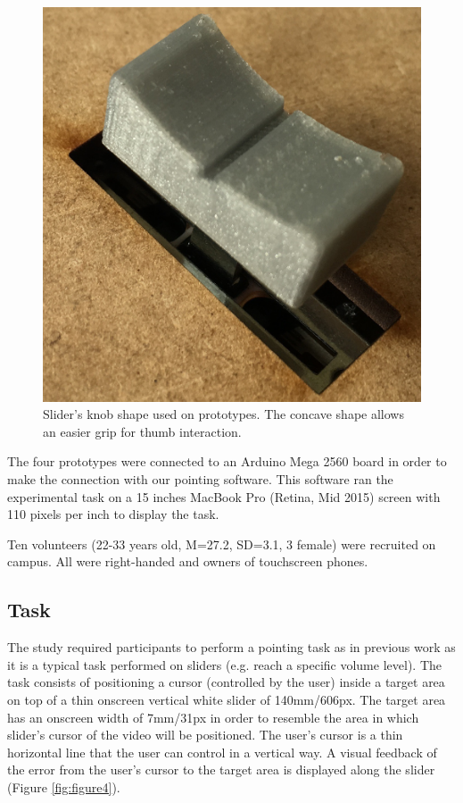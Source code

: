 \documentclass{sigchi}
\begin{document}
\begin{figure}[h]
\centering
  \includegraphics[width=0.4\columnwidth]{figures/knob}
  \caption{Slider's knob shape used on prototypes. The concave shape allows an easier grip for thumb interaction.}
  \label{fig:figure3}
\end{figure}

The four prototypes were connected to an Arduino Mega 2560 board in order to make the connection with our pointing software. This software ran the experimental task on a 15 inches MacBook Pro (Retina, Mid 2015) screen with 110 pixels per inch to display the task.

Ten volunteers (22-33 years old, M=27.2, SD=3.1, 3 female) were recruited on campus. All were right-handed and owners of touchscreen phones.

\subsection{Task}
The study required participants to perform a pointing task as in previous work \cite{Coutrix2015,Casiez08theimpact} as it is a typical task performed on sliders (e.g. reach a specific volume level). The task consists of positioning a cursor (controlled by the user) inside a target area on top of a thin onscreen vertical white slider of 140mm/606px. The target area has an onscreen width of 7mm/31px in order to resemble the area in which slider’s cursor of the video will be positioned. The user’s cursor is a thin horizontal line that the user can control in a vertical way. A visual feedback of the error from the user’s cursor to the target area is displayed along the slider (Figure \ref{fig:figure4}).
\end{document}
